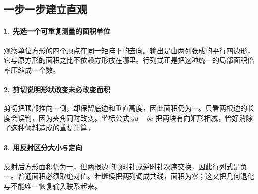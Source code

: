 \subsection*{一步一步建立直观}

\paragraph{1. 先选一个可重复测量的面积单位}

观察单位方形的四个顶点在同一矩阵下的去向。输出是由两列张成的平行四边形，它与原方形的面积之比不依赖方形放在哪里。行列式正是把这种统一的局部面积倍率压缩成一个数。



\paragraph{2. 剪切说明形状改变未必改变面积}

剪切把顶部推向一侧，却保留底边和垂直高度，因此面积仍为一。只看两根边的长度会误判，因为夹角同时改变。坐标公式 $ad-bc$ 把两块有向矩形相减，恰好消除了这种倾斜造成的重复计算。



\paragraph{3. 用反射区分大小与定向}

反射后方形面积仍为一，但两根边的顺时针或逆时针次序交换，因此行列式是负一。普通面积必须取绝对值。若继续把两列调成共线，面积为零；这又把几何退化与不能唯一恢复输入联系起来。
